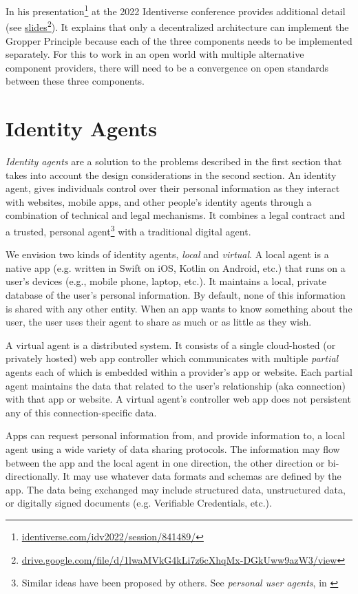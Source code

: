 \documentclass[11pt, oneside]{article}   	%
\newcommand{\hyperfootnote}[1][]{\def\ArgI{{#1}}\hyperfootnoteRelay}
\newcommand\hyperfootnoteRelay[2][]{\href{#1#2}{\ArgI}\footnote{\href{#1#2}{#2}}}
\begin{document}
In his presentation\hyperfootnote[][https://]{identiverse.com/idv2022/session/841489/} at the 2022 Identiverse conference provides additional detail (see \hyperfootnote[slides][https://]{drive.google.com/file/d/1lwaMVkG4kLi7z6cXhqMx-DGkUww9azW3/view}). It explains that only a decentralized architecture can implement the Gropper Principle because each of the three components needs to be implemented separately. For this to work in an open world with multiple alternative component providers, there will need to be a convergence on open standards between these three components. 

\section{Identity Agents} %

 \emph{Identity agents} are a solution to the problems described in the first section that takes into account the design considerations in the second section. An identity agent, gives individuals control over their personal information as they interact with websites, mobile apps, and other people's identity agents through a combination of technical and legal mechanisms. It combines a legal contract and a trusted, personal agent\footnote{Similar ideas have been proposed by others. See \emph{personal user agents}, in \cite[p24]{Flanagan2020}} with a traditional digital agent\cite{Graham2023}. 

We envision two kinds of identity agents, \emph{local} and \emph{virtual}. A local agent is a native app (e.g. written in Swift on iOS, Kotlin on Android, etc.) that runs on a user's devices (e.g., mobile phone, laptop, etc.). It maintains a local, private database of the user's personal information. By default, none of this information is shared with any other entity. When an app wants to know something about the user, the user uses their agent to share as much or as little as they wish. 

A virtual agent is a distributed system. It consists of a single cloud-hosted (or privately hosted) web app controller which communicates with multiple \emph{partial} agents each of which is embedded within a provider's app or website. Each partial agent maintains the data that related to the user's relationship (aka connection) with that app or website. A virtual agent's controller web app does not persistent any of this connection-specific data. 

Apps can request personal information from, and provide information to, a local agent using a wide variety of data sharing protocols. The information may flow between the app and the local agent in one direction, the other direction or bi-directionally. It may use whatever data formats and schemas are defined by the app. The data being exchanged may include structured data, unstructured data, or digitally signed documents (e.g. Verifiable Credentials, etc.). 

\end{document}
